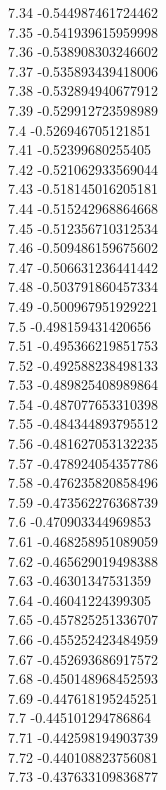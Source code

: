{7.34	-0.544987461724462\\
7.35	-0.541939615959998\\
7.36	-0.538908303246602\\
7.37	-0.535893439418006\\
7.38	-0.532894940677912\\
7.39	-0.529912723598989\\
7.4	-0.526946705121851\\
7.41	-0.52399680255405\\
7.42	-0.521062933569044\\
7.43	-0.518145016205181\\
7.44	-0.515242968864668\\
7.45	-0.512356710312534\\
7.46	-0.509486159675602\\
7.47	-0.506631236441442\\
7.48	-0.503791860457334\\
7.49	-0.500967951929221\\
7.5	-0.498159431420656\\
7.51	-0.495366219851753\\
7.52	-0.492588238498133\\
7.53	-0.489825408989864\\
7.54	-0.487077653310398\\
7.55	-0.484344893795512\\
7.56	-0.481627053132235\\
7.57	-0.478924054357786\\
7.58	-0.476235820858496\\
7.59	-0.473562276368739\\
7.6	-0.470903344969853\\
7.61	-0.468258951089059\\
7.62	-0.465629019498388\\
7.63	-0.46301347531359\\
7.64	-0.46041224399305\\
7.65	-0.457825251336707\\
7.66	-0.455252423484959\\
7.67	-0.452693686917572\\
7.68	-0.450148968452593\\
7.69	-0.447618195245251\\
7.7	-0.445101294786864\\
7.71	-0.442598194903739\\
7.72	-0.440108823756081\\
7.73	-0.437633109836877\\
}
